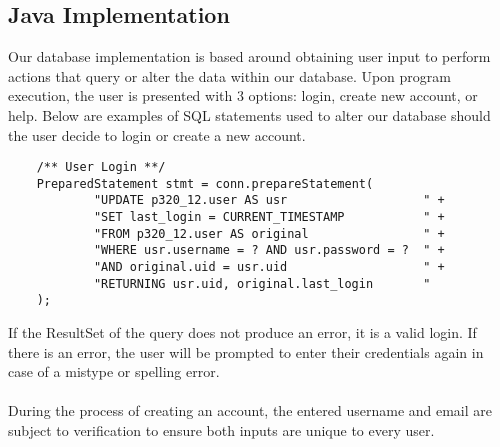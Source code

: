 \documentclass[12pt]{article}
\begin{document}
    \subsection{Java Implementation}
    Our database implementation is based around obtaining user input to
    perform actions that query or alter the data within our database. Upon program
    execution, the user is presented with 3 options: login, create new account, or help.
    Below are examples of SQL statements used to alter our database should the user
    decide to login or create a new account.
    \begin{lstlisting}
    /** User Login **/
    PreparedStatement stmt = conn.prepareStatement(
            "UPDATE p320_12.user AS usr                   " +
            "SET last_login = CURRENT_TIMESTAMP           " +
            "FROM p320_12.user AS original                " +
            "WHERE usr.username = ? AND usr.password = ?  " +
            "AND original.uid = usr.uid                   " +
            "RETURNING usr.uid, original.last_login       "
    );
    \end{lstlisting}
    If the ResultSet of the query does not produce an error, it is a valid login.
    If there is an error, the user will be prompted to enter their credentials again
    in case of a mistype or spelling error.
    \\~\\
    During the process of creating an account, the entered username and email are
    subject to verification to ensure both inputs are unique to every user.
\end{document}
